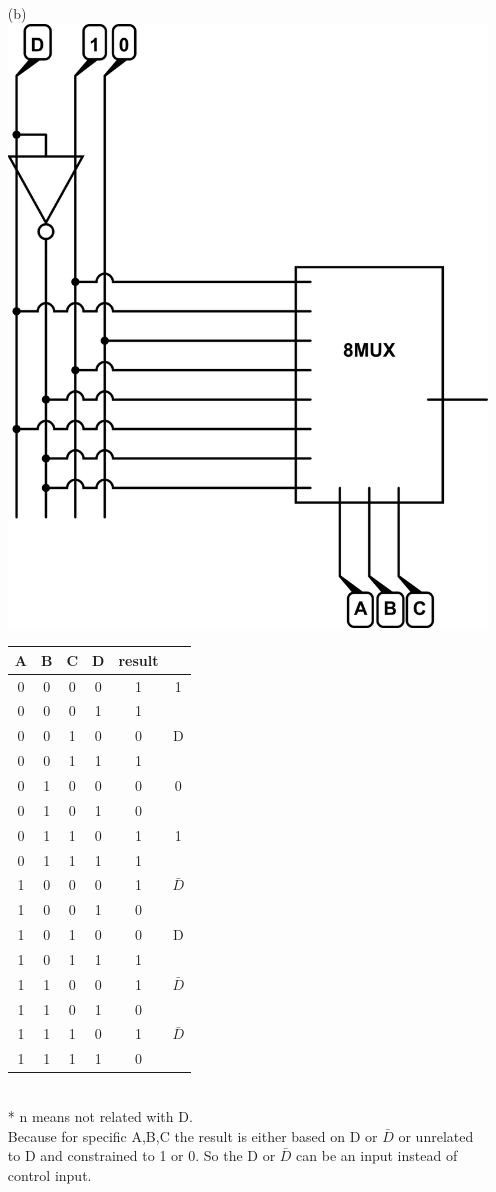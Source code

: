 \documentclass[10pt,twoside,a4paper]{article}
\begin{document}
\begin{enumerate}
\item[(b)]
\includegraphics[scale=0.4]{sv2-2-b.png} 
\begin{tabular}{c c c c c c}
A & B & C & D & result & \\
\hline
0&0&0&0&1&1\\
0&0&0&1&1&\\\hhline{----}
0&0&1&0&0&D\\
0&0&1&1&1&\\\hhline{----}
0&1&0&0&0&0\\
0&1&0&1&0&\\\hhline{----}
0&1&1&0&1&1\\
0&1&1&1&1&\\\hhline{----}
1&0&0&0&1&$\bar{D}$\\
1&0&0&1&0&\\\hhline{----}
1&0&1&0&0&D\\
1&0&1&1&1&\\\hhline{----}
1&1&0&0&1&$\bar{D}$\\
1&1&0&1&0&\\\hhline{----}
1&1&1&0&1&$\bar{D}$\\
1&1&1&1&0&\\
\end{tabular}\\
* n means not related with D. \\
Because for specific A,B,C the result is either based on D or $\bar{D}$ or unrelated to D and constrained to 1 or 0. So the D or $\bar{D}$ can be an input instead of control input.

\end{enumerate}
\end{document}

